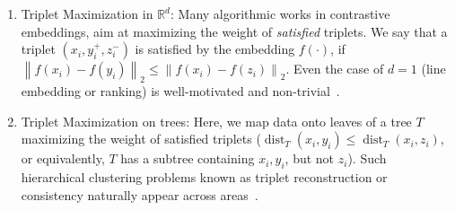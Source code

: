 \documentclass{article}
\theoremstyle{definition}  %
\theoremstyle{plain}
\numberwithin{observation}{section}
\numberwithin{claim}{section}
\numberwithin{fact}{section}
\numberwithin{lemma}{section}
\numberwithin{proposition}{section}
\numberwithin{theorem}{section}
\numberwithin{corollary}{section}
\numberwithin{definition}{section}
\newcommand{\lnorm}{\left\lVert}
\newcommand{\rnorm}{\right\rVert}
\DeclareMathOperator{\dist}{dist}
\newcommand{\x}{x}
\newcommand{\y}{y}
\newcommand{\z}{z}
\newcommand{\anc}{\x}
\newcommand{\pos}{\y}
\renewcommand{\neg}{\z}
\theoremstyle{plain}
\begin{document}
\begin{enumerate}[leftmargin=*]
    \item\label{obj1} Triplet Maximization in $\mathbb{R}^d$: Many algorithmic works in contrastive embeddings, aim at maximizing the weight of \textit{satisfied} triplets. We say that a triplet $(\anc_i, \pos_i^+, \neg_{i}^-)$ is satisfied by the embedding $f(\cdot)$, if $\lnorm f(x_i)-f(y_i)\rnorm_2 \le \lnorm f(x_i)-f(z_i)\rnorm_2$. Even the case of $d=1$ (line embedding or ranking) is well-motivated and non-trivial~\citep{arora1995polynomial,arora2002new,GHMRC11,fan2020learning}.
    


    
    \item \label{obj2} Triplet Maximization on trees: %
    Here, we map data onto leaves of a tree $T$ maximizing the weight of satisfied triplets %
    ($\dist_T(x_i,y_i) \le  \dist_T(x_i,z_i)$, or equivalently, $T$ has a subtree containing $\anc_i, y_i$, but not $z_i$). Such hierarchical clustering problems known as triplet reconstruction or consistency naturally appear across areas~\citep{aho1981inferring,byrka2010new,vikram2016interactive,bodirsky2017complexity,chatziafratis2018hierarchical,emamjomeh2018adaptive}.  


\end{enumerate}
\end{document}
